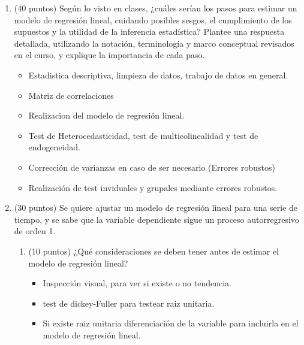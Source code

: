 \documentclass[10pt,a4paper]{article}
\begin{document}
\begin{enumerate}
    \item (40 puntos) Según lo visto en clases, ¿cuáles serían los pasos para estimar un modelo de regresión lineal, cuidando posibles sesgos, el cumplimiento de los supuestos y la utilidad de la inferencia estadística? Plantee una respuesta detallada, utilizando la notación, terminología y marco conceptual revisados en el curso, y explique la importancia de cada paso.
\\
\begin{itemize}
    \item Estadistica descriptiva, limpieza de datos, trabajo de datos en general.
    \item Matriz de correlaciones
    \item Realizacion del modelo de regresión lineal.
    \item Test de Heterocedasticidad, test de multicolinealidad y test de endogeneidad.
    \item Corrección de varianzas en caso de ser necesario (Errores robustos)
    \item Realización de test inviduales y grupales mediante errores robustos.
\end{itemize}

    \item (30 puntos) Se quiere ajustar un modelo de regresión lineal para
una serie de tiempo, y se sabe que la variable dependiente sigue un
proceso autorregresivo de orden 1.
\begin{enumerate}
    \item (10 puntos) ¿Qué consideraciones se deben tener antes de estimar el
    modelo de regresión lineal?
    \\
    \begin{itemize}
        \item Inspección visual, para ver si existe o no tendencia.
        \item test de dickey-Fuller para testear raiz unitaria.
        \item Si existe raiz unitaria diferenciación de la variable para incluirla en el modelo de regresión lineal.
    \end{itemize}
    

\end{enumerate}
\end{enumerate}
\end{document}
